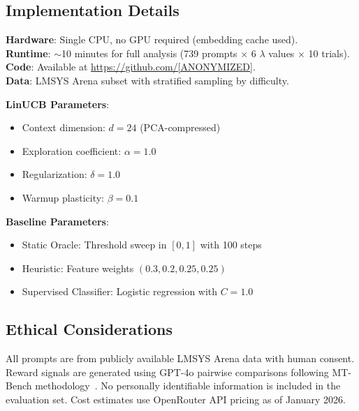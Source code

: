 \subsection{Implementation Details}

\textbf{Hardware}: Single CPU, no GPU required (embedding cache used). \\
\textbf{Runtime}: $\sim$10 minutes for full analysis (739 prompts $\times$ 6 $\lambda$ values $\times$ 10 trials). \\
\textbf{Code}: Available at \url{https://github.com/[ANONYMIZED]}. \\
\textbf{Data}: LMSYS Arena subset with stratified sampling by difficulty.

\textbf{LinUCB Parameters}:
\begin{itemize}
    \item Context dimension: $d = 24$ (PCA-compressed)
    \item Exploration coefficient: $\alpha = 1.0$
    \item Regularization: $\delta = 1.0$
    \item Warmup plasticity: $\beta = 0.1$
\end{itemize}

\textbf{Baseline Parameters}:
\begin{itemize}
    \item Static Oracle: Threshold sweep in $[0, 1]$ with 100 steps
    \item Heuristic: Feature weights $(0.3, 0.2, 0.25, 0.25)$
    \item Supervised Classifier: Logistic regression with $C=1.0$
\end{itemize}

\subsection{Ethical Considerations}

All prompts are from publicly available LMSYS Arena data with human consent. Reward signals are generated using GPT-4o pairwise comparisons following MT-Bench methodology~\cite{zheng2023judging}. No personally identifiable information is included in the evaluation set. Cost estimates use OpenRouter API pricing as of January 2026.

